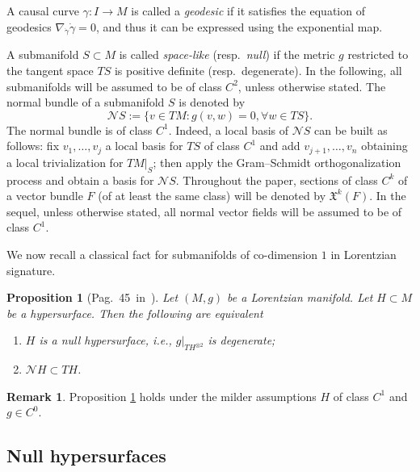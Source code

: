\documentclass[12pt,a4paper]{amsart}
\theoremstyle{plain}
\newtheorem{proposition}[lemma]{Proposition}
\theoremstyle{definition}
\newtheorem{remark}[lemma]{Remark}
\numberwithin{equation}{section}
\newcommand{\vfield}{\mathfrak{X}}
\newcommand{\normal}{\mathscr{N}}
\begin{document}
A causal curve $\gamma:I\to M$ is called a \emph{geodesic} if it 
satisfies the equation of geodesics $\nabla_{\dot\gamma}\dot\gamma=0$, 
and thus it can be expressed
  using the exponential map.
%




\smallskip
%
A submanifold $S\subset M$ is called \emph{space-like} (resp.\ \emph{null}) if the metric $g$
restricted to the tangent space $TS$ is positive definite (resp.\
degenerate).
%
In the following, all submanifolds will be assumed to be
  of class $C^2$, unless otherwise stated.
%
The normal bundle of a submanifold $S$ is denoted by
$$\normal S:=\{v\in TM: g(v,w)=0,\forall w\in TS\}.$$
%
The normal bundle is of class $C^1$.
%
Indeed, a local basis of $\normal S$ can be built as follows: fix
$v_1,\dots, v_j$ a local basis for $TS$ of class $C^{1}$ and add
$v_{j+1},\dots, v_n$ obtaining a local trivialization for $TM|_S$; then
apply the Gram--Schmidt orthogonalization process and obtain a basis
for $\normal S$. 
%
Throughout the paper, sections of class $C^k$ of a vector bundle $F$ (of at least the same class) will be denoted by $\vfield^k(F)$.
%
In the sequel, unless otherwise stated, all normal vector
  fields will be assumed to be of class $C^1$.

We now recall a classical fact for submanifolds of co-dimension $1$ in Lorentzian signature.

\begin{proposition}[Pag.~45~in~\cite{HawEll}]\label{Prop:NHinTH}
  Let $(M,g)$ be a Lorentzian manifold.
  Let $H\subset M$ be a hypersurface.
  Then the following are equivalent
  \begin{enumerate}
  \item $H$ is a null hypersurface, i.e., $g|_{TH^{\otimes 2}}$ is
    degenerate;
  \item
    $\normal H\subset TH$.
  \end{enumerate}
\end{proposition}

  \begin{remark}
    Proposition \ref{Prop:NHinTH} holds  under the milder assumptions $H$
    of class $C^1$ and $g\in C^0$.
  \end{remark}


 

\subsection{Null hypersurfaces}\label{Ss:null}
\end{document}
